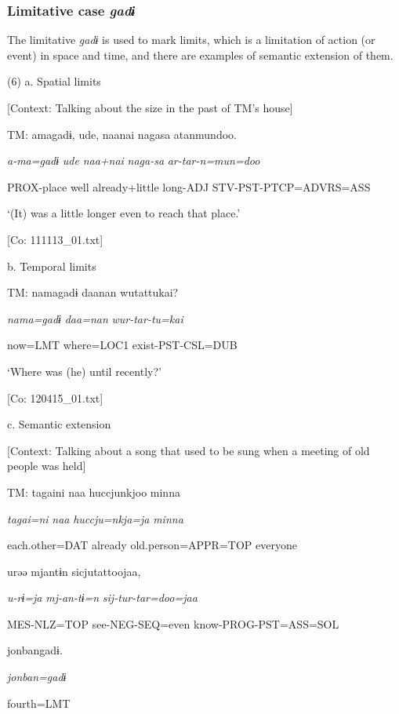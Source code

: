 \subsubsection{ Limitative case \textit{gadɨ}}

The limitative \textit{gadɨ} is used to mark limits, which is a limitation of action (or event) in space and time, and there are examples of semantic extension of them.

(6)  a. Spatial limits

  [Context: Talking about the size in the past of TM’s house]

  TM:  amagadɨ,  ude,  naanai  nagasa  atanmundoo.

    \textit{a-ma=gadɨ}  \textit{ude}  \textit{naa+nai}  \textit{naga-sa}  \textit{ar-tar-n=mun=doo}

    PROX-place  well  already+little  long-ADJ  STV-PST-PTCP=ADVRS=ASS

    ‘(It) was a little longer even to reach that place.’

    [Co: 111113\_01.txt]

  b. Temporal limits

  TM:  namagadɨ  daanan  wutattukai?

    \textit{nama=gadɨ}  \textit{daa=nan}  \textit{wur-tar-tu=kai}

    now=LMT  where=LOC1  exist-PST-CSL=DUB

    ‘Where was (he) until recently?’

    [Co: 120415\_01.txt]

  c. Semantic extension

  [Context: Talking about a song that used to be sung when a meeting of old people was held]

  TM:  {\textbar}tagaini{\textbar}  naa  huccjunkjoo  minna

    \textit{tagai=ni}  \textit{naa}  \textit{huccju=nkja=ja}  \textit{minna}

    each.other=DAT  already  old.person=APPR=TOP  everyone

    urəə  mjantɨn  sicjutattoojaa,

    \textit{u-rɨ=ja}  \textit{mj-an-tɨ=n}  \textit{sij-tur-tar=doo=jaa}

    MES-NLZ=TOP  see-NEG-SEQ=even  know-PROG-PST=ASS=SOL

    {\textbar}jonban{\textbar}gadɨ.

    \textit{jonban=gadɨ}

    fourth=LMT


